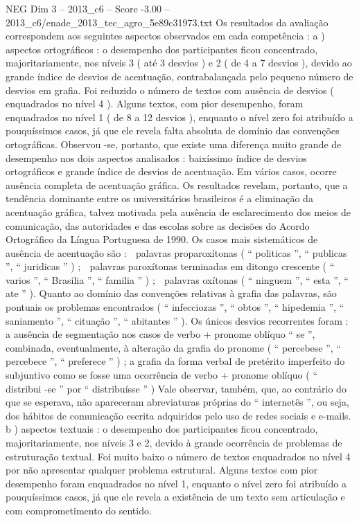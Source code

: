 \begin{textsample}{NEG Dim 3 – 2013\_c6 – Score -3.00 – 2013\_c6/enade\_2013\_tec\_agro\_5e89c31973.txt}
Os resultados da avaliação correspondem aos seguintes aspectos observados em cada competência : a ) aspectos ortográficos : o desempenho dos participantes ficou concentrado, majoritariamente, nos níveis 3 ( até 3 desvios ) e 2 ( de 4 a 7 desvios ), devido ao grande índice de desvios de acentuação, contrabalançada pelo pequeno número de desvios em grafia.
Foi reduzido o número de textos com ausência de desvios ( enquadrados no nível 4 ).
Alguns textos, com pior desempenho, foram enquadrados no nível 1 ( de 8 a 12 desvios ), enquanto o nível zero foi atribuído a pouquíssimos casos, já que ele revela falta absoluta de domínio das convenções ortográficas.
Observou -se, portanto, que existe uma diferença muito grande de desempenho nos dois aspectos analisados : baixíssimo índice de desvios ortográficos e grande índice de desvios de acentuação.
Em vários casos, ocorre ausência completa de acentuação gráfica.
Os resultados revelam, portanto, que a tendência dominante entre os universitários brasileiros é a eliminação da acentuação gráfica, talvez motivada pela ausência de esclarecimento dos meios de comunicação, das autoridades e das escolas sobre as decisões do Acordo Ortográfico da Língua Portuguesa de 1990.
Os casos mais sistemáticos de ausência de acentuação são :  palavras proparoxítonas ( “ politicas ”, “ publicas ”, “ juridicas ” ) ;  palavras paroxítonas terminadas em ditongo crescente ( “ varios ”, “ Brasilia ”, “ familia ” ) ;  palavras oxítonas ( “ ninguem ”, “ esta ”, “ ate ” ).
Quanto ao domínio das convenções relativas à grafia das palavras, são pontuais os problemas encontrados ( “ infecciozas ”, “ obtos ”, “ hipedemia ”, “ saniamento ”, “ cituação ”, “ abitantes ” ).
Os únicos desvios recorrentes foram : a ausência de segmentação nos casos de verbo + pronome oblíquo “ se ”, combinada, eventualmente, à alteração da grafia do pronome ( “ percebese ”, “ percebece ”, “ preferece ” ) ; a grafia da forma verbal de pretérito imperfeito do subjuntivo como se fosse uma ocorrência de verbo + pronome oblíquo ( “ distribui -se ” por “ distribuísse ” ) Vale observar, também, que, ao contrário do que se esperava, não apareceram abreviaturas próprias do “ internetês ”, ou seja, dos hábitos de comunicação escrita adquiridos pelo uso de redes sociais e e-mails. b ) aspectos textuais : o desempenho dos participantes ficou concentrado, majoritariamente, nos níveis 3 e 2, devido à grande ocorrência de problemas de estruturação textual.
Foi muito baixo o número de textos enquadrados no nível 4 por não apresentar qualquer problema estrutural.
Alguns textos com pior desempenho foram enquadrados no nível 1, enquanto o nível zero foi atribuído a pouquíssimos casos, já que ele revela a existência de um texto sem articulação e com comprometimento do sentido.

\end{textsample}
